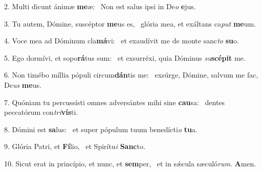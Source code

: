 2. Multi dicunt ánimæ \textbf{me}æ: \ast\  Non est salus ipsi in De\textit{o} \textbf{e}jus.\

3. Tu autem, Dómine, suscéptor \textbf{me}us es, \ast\  glória mea, et exáltans ca\textit{put} \textbf{me}um.\

4. Voce mea ad Dóminum cla\textbf{má}vi: \ast\  et exaudívit me de monte sanc\textit{to} \textbf{su}o.\

5. Ego dormívi, et sopo\textbf{rá}tus sum: \ast\  et exsurréxi, quia Dóminus \textit{su}\textbf{scé}\textbf{pit} me.\

6. Non timébo míllia pópuli circum\textbf{dán}tis me: \ast\  exsúrge, Dómine, salvum me fac, De\textit{us} \textbf{me}us.\

7. Quóniam tu percussísti omnes adversántes mihi sine \textbf{cau}sa: \ast\  dentes peccatórum con\textit{tri}\textbf{vís}ti.\

8. Dómini est \textbf{sa}lus: \ast\  et super pópulum tuum benedícti\textit{o} \textbf{tu}a.\

9. Glória Patri, et \textbf{Fí}lio, \ast\  et Spirítu\textit{i} \textbf{Sanc}to.\

10. Sicut erat in princípio, et nunc, et \textbf{sem}per, \ast\  et in sǽcula sæculó\textit{rum}. \textbf{A}men.\

